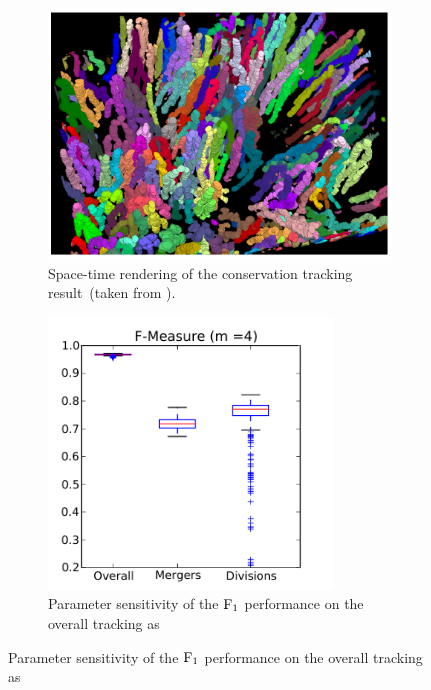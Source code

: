 \begin{figure}
    \centering
    \begin{subfigure}[t]{0.48\textwidth}
        \centering
        \includegraphics[width=\textwidth]{images/gmm/results/C/space_time_rendering.png}
        \caption{Space-time rendering of the conservation tracking result~(taken from
            \citealp[Figure~6c]{schiegg_13_conservation}).}
        \label{fig:gmm-results-c-visualization}
    \end{subfigure}
    \hfill
    \begin{subfigure}[t]{0.48\textwidth}
        \centering
        \includegraphics[width=0.828\textwidth]{images/gmm/results/C/sensitivity.png}
        \caption{Parameter sensitivity of the $\operatorname{F}_{1}$ performance on the overall tracking as
}
\end{subfigure}
\end{figure}
